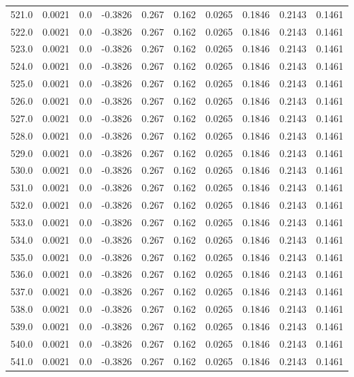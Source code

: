\begin{longtable}{lrrrrrrrrr}
521.0 & 0.0021 & 0.0 & -0.3826 & 0.267 & 0.162 & 0.0265 & 0.1846 & 0.2143 & 0.1461 \\
522.0 & 0.0021 & 0.0 & -0.3826 & 0.267 & 0.162 & 0.0265 & 0.1846 & 0.2143 & 0.1461 \\
523.0 & 0.0021 & 0.0 & -0.3826 & 0.267 & 0.162 & 0.0265 & 0.1846 & 0.2143 & 0.1461 \\
524.0 & 0.0021 & 0.0 & -0.3826 & 0.267 & 0.162 & 0.0265 & 0.1846 & 0.2143 & 0.1461 \\
525.0 & 0.0021 & 0.0 & -0.3826 & 0.267 & 0.162 & 0.0265 & 0.1846 & 0.2143 & 0.1461 \\
526.0 & 0.0021 & 0.0 & -0.3826 & 0.267 & 0.162 & 0.0265 & 0.1846 & 0.2143 & 0.1461 \\
527.0 & 0.0021 & 0.0 & -0.3826 & 0.267 & 0.162 & 0.0265 & 0.1846 & 0.2143 & 0.1461 \\
528.0 & 0.0021 & 0.0 & -0.3826 & 0.267 & 0.162 & 0.0265 & 0.1846 & 0.2143 & 0.1461 \\
529.0 & 0.0021 & 0.0 & -0.3826 & 0.267 & 0.162 & 0.0265 & 0.1846 & 0.2143 & 0.1461 \\
530.0 & 0.0021 & 0.0 & -0.3826 & 0.267 & 0.162 & 0.0265 & 0.1846 & 0.2143 & 0.1461 \\
531.0 & 0.0021 & 0.0 & -0.3826 & 0.267 & 0.162 & 0.0265 & 0.1846 & 0.2143 & 0.1461 \\
532.0 & 0.0021 & 0.0 & -0.3826 & 0.267 & 0.162 & 0.0265 & 0.1846 & 0.2143 & 0.1461 \\
533.0 & 0.0021 & 0.0 & -0.3826 & 0.267 & 0.162 & 0.0265 & 0.1846 & 0.2143 & 0.1461 \\
534.0 & 0.0021 & 0.0 & -0.3826 & 0.267 & 0.162 & 0.0265 & 0.1846 & 0.2143 & 0.1461 \\
535.0 & 0.0021 & 0.0 & -0.3826 & 0.267 & 0.162 & 0.0265 & 0.1846 & 0.2143 & 0.1461 \\
536.0 & 0.0021 & 0.0 & -0.3826 & 0.267 & 0.162 & 0.0265 & 0.1846 & 0.2143 & 0.1461 \\
537.0 & 0.0021 & 0.0 & -0.3826 & 0.267 & 0.162 & 0.0265 & 0.1846 & 0.2143 & 0.1461 \\
538.0 & 0.0021 & 0.0 & -0.3826 & 0.267 & 0.162 & 0.0265 & 0.1846 & 0.2143 & 0.1461 \\
539.0 & 0.0021 & 0.0 & -0.3826 & 0.267 & 0.162 & 0.0265 & 0.1846 & 0.2143 & 0.1461 \\
540.0 & 0.0021 & 0.0 & -0.3826 & 0.267 & 0.162 & 0.0265 & 0.1846 & 0.2143 & 0.1461 \\
541.0 & 0.0021 & 0.0 & -0.3826 & 0.267 & 0.162 & 0.0265 & 0.1846 & 0.2143 & 0.1461 \\

\end{longtable}

